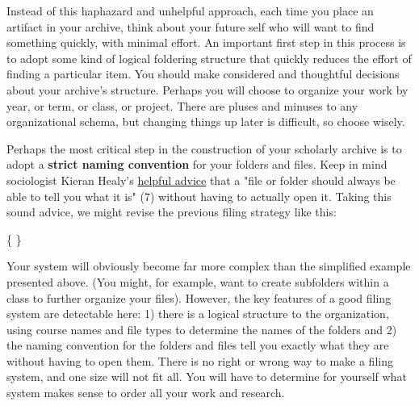 Instead of this haphazard and unhelpful approach, each time you place an artifact in your archive, think about your future self who will want to find something quickly, with minimal effort. An important first step in this process is to adopt some kind of logical foldering structure that quickly reduces the effort of finding a particular item. You should make considered and thoughtful decisions about your archive's structure. Perhaps you will choose to organize your work by year, or term, or class, or project. There are pluses and minuses to any organizational schema, but changing things up later is difficult, so choose wisely. 

Perhaps the most critical step in the construction of your scholarly archive is to adopt a \textbf{strict naming convention} for your folders and files. Keep in mind sociologist Kieran Healy's \href{https://kieranhealy.org/files/papers/plain-person-text.pdf}{helpful advice} that a "file or folder should always be able to tell you what it is" (7) without having to actually open it. Taking this sound advice, we might revise the previous filing strategy like this:

\medskip

{\large
{}
}

\begin{center} \{  \} \end{center}

Your system will obviously become far more complex than the simplified example presented above. (You might, for example, want to create subfolders within a class to further organize your files). However, the key features of a good filing system are detectable here: 1) there is a logical structure to the organization, using course names and file types to determine the names of the folders and 2) the naming convention for the folders and files tell you exactly what they are without having to open them. There is no right or wrong way to make a filing system, and one size will not fit all. You will have to determine for yourself what system makes sense to order all your work and research. 


